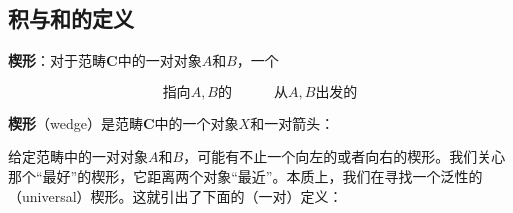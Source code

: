 \documentclass[b5paper]{ctexart}
\begin{document}
\subsection{积与和的定义}
 
\begin{definition}
\textbf{楔形}：对于范畴$\pmb{C}$中的一对对象$A$和$B$，一个

\[
\text{指向$A, B$的} \quad \quad \quad \text{从$A, B$出发的}
\]

\textbf{楔形}（wedge）是范畴$\pmb{C}$中的一个对象$X$和一对箭头：

\begin{center}
\end{center}
\end{definition}

给定范畴中的一对对象$A$和$B$，可能有不止一个向左的或者向右的楔形。我们关心那个“最好”的楔形，它距离两个对象“最近”。本质上，我们在寻找一个泛性的（universal）楔形。这就引出了下面的（一对）定义：
\end{document}
